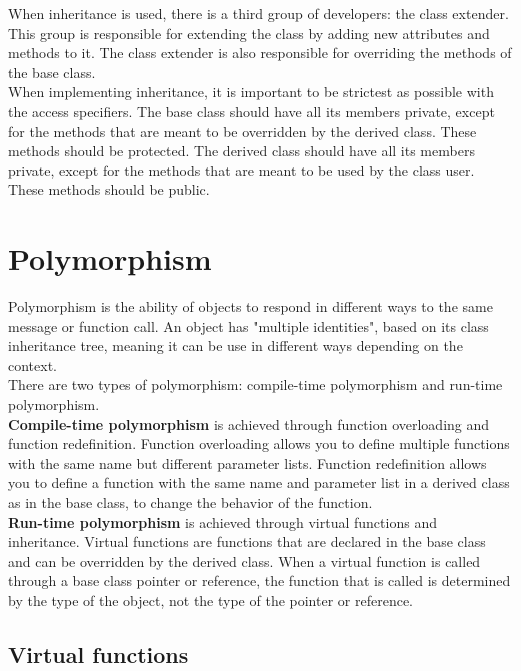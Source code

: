 When inheritance is used, there is a third group of developers: the class extender. This
group is responsible for extending the class by adding new attributes and methods to it.
The class extender is also responsible for overriding the methods of the base class.\\

When implementing inheritance, it is important to be strictest as possible with the
access specifiers. The base class should have all its members private, except for the
methods that are meant to be overridden by the derived class. These methods should be
protected. The derived class should have all its members private, except for the methods
that are meant to be used by the class user. These methods should be public.

\section{Polymorphism}

Polymorphism is the ability of objects to respond in different ways to the same message or
function call. An object has "multiple identities", based on its class inheritance tree, meaning
it can be use in different ways depending on the context.\\

There are two types of polymorphism: compile-time polymorphism and run-time polymorphism.\\

\textbf{Compile-time polymorphism} is achieved through function overloading and function
redefinition. Function overloading allows you to define multiple functions with the same
name but different parameter lists. Function redefinition allows you to define a function
with the same name and parameter list in a derived class as in the base class, to change
the behavior of the function.\\

\textbf{Run-time polymorphism} is achieved through virtual functions and inheritance. Virtual
functions are functions that are declared in the base class and can be overridden by the
derived class. When a virtual function is called through a base class pointer or reference,
the function that is called is determined by the type of the object, not the type of the
pointer or reference.\\

\subsection{Virtual functions}

